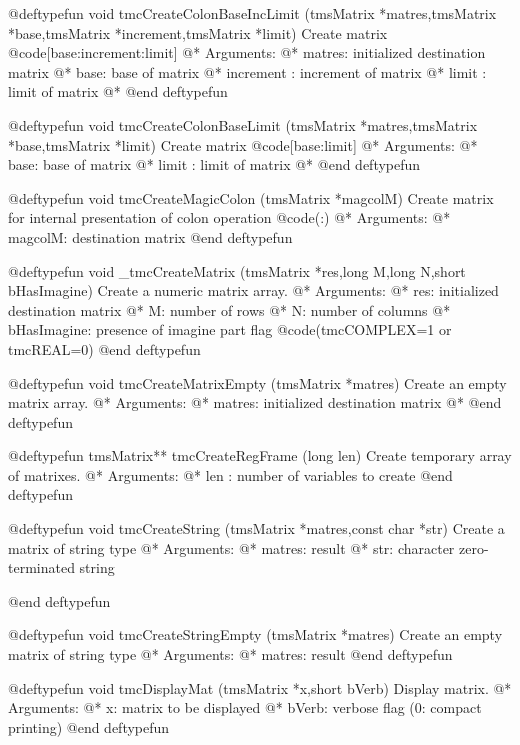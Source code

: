@deftypefun         void tmcCreateColonBaseIncLimit (tmsMatrix *matres,tmsMatrix *base,tmsMatrix *increment,tmsMatrix *limit)
Create matrix @code{[base:increment:limit]}	 @*
Arguments: @*
matres: initialized destination matrix @*
base: base of matrix @*
increment : increment of matrix @*
limit : limit of matrix @*
@end deftypefun



@deftypefun          void tmcCreateColonBaseLimit (tmsMatrix *matres,tmsMatrix *base,tmsMatrix *limit)
Create matrix @code{[base:limit]}		 @*
Arguments: @*
base: base of matrix @*
limit : limit of matrix @*
@end deftypefun



@deftypefun   void tmcCreateMagicColon (tmsMatrix *magcolM)
Create matrix for internal presentation of colon operation @code{(:)}	 @*
Arguments: @*
magcolM: destination matrix
@end deftypefun



@deftypefun         void  _tmcCreateMatrix (tmsMatrix *res,long M,long N,short bHasImagine)
Create  a numeric matrix array. @*
Arguments: @*
	res: initialized destination matrix @*
	M: number of rows @*
	N: number of columns @*
	bHasImagine: presence of imagine part flag @code{(tmcCOMPLEX=1 or tmcREAL=0)}
@end deftypefun



@deftypefun         void tmcCreateMatrixEmpty (tmsMatrix *matres)
Create  an empty matrix array. @*
Arguments: @*
	matres: initialized destination matrix @*
@end deftypefun



@deftypefun          tmsMatrix** tmcCreateRegFrame (long len)
Create temporary array of matrixes. @*
Arguments: @*
len : number of variables to create
@end deftypefun


@deftypefun          void tmcCreateString (tmsMatrix *matres,const char *str)
Create a matrix of string type	 @*
Arguments: @*
matres: result @*
str: character zero-terminated string 

@end deftypefun


@deftypefun          void tmcCreateStringEmpty (tmsMatrix *matres)
Create an empty matrix of string type	 @*
Arguments: @*
matres: result
@end deftypefun




@deftypefun          void tmcDisplayMat (tmsMatrix *x,short bVerb)
Display matrix. @*
Arguments: @*
x: matrix to be displayed @*
bVerb: verbose flag (0: compact printing)
@end deftypefun




